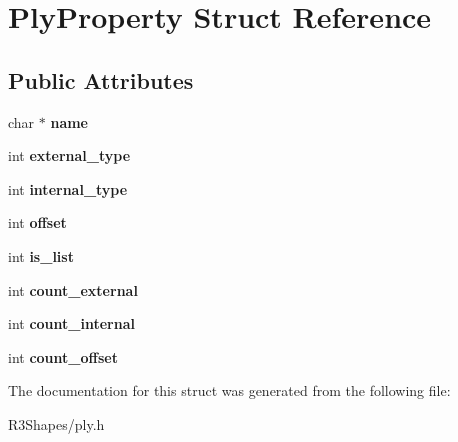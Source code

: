 \hypertarget{struct_ply_property}{}\section{Ply\+Property Struct Reference}
\label{struct_ply_property}
\subsection*{Public Attributes}
\begin{DoxyCompactItemize}
\item 
char $\ast$ {\bfseries name}\hypertarget{struct_ply_property_a286f11ca61eb9eaa3c52a44bbaeadfc9}{}\label{struct_ply_property_a286f11ca61eb9eaa3c52a44bbaeadfc9}

\item 
int {\bfseries external\+\_\+type}\hypertarget{struct_ply_property_a0ddc732a043a2dceef8cd0849f8fe61e}{}\label{struct_ply_property_a0ddc732a043a2dceef8cd0849f8fe61e}

\item 
int {\bfseries internal\+\_\+type}\hypertarget{struct_ply_property_a52decfabbe6c612b2c10213207b0a2d6}{}\label{struct_ply_property_a52decfabbe6c612b2c10213207b0a2d6}

\item 
int {\bfseries offset}\hypertarget{struct_ply_property_aeedc40380a29a69699ce401f4cb7aa3f}{}\label{struct_ply_property_aeedc40380a29a69699ce401f4cb7aa3f}

\item 
int {\bfseries is\+\_\+list}\hypertarget{struct_ply_property_abe1deb9f2985fc45921c51b9b762a9c9}{}\label{struct_ply_property_abe1deb9f2985fc45921c51b9b762a9c9}

\item 
int {\bfseries count\+\_\+external}\hypertarget{struct_ply_property_a237469e443b4a87444ce5e21512b2649}{}\label{struct_ply_property_a237469e443b4a87444ce5e21512b2649}

\item 
int {\bfseries count\+\_\+internal}\hypertarget{struct_ply_property_a3d8a82157e2863a19b63886a3488cc64}{}\label{struct_ply_property_a3d8a82157e2863a19b63886a3488cc64}

\item 
int {\bfseries count\+\_\+offset}\hypertarget{struct_ply_property_a1f788f0c065d945e271e8c4d985d2bf2}{}\label{struct_ply_property_a1f788f0c065d945e271e8c4d985d2bf2}

\end{DoxyCompactItemize}


The documentation for this struct was generated from the following file\+:\begin{DoxyCompactItemize}
\item 
R3\+Shapes/ply.\+h\end{DoxyCompactItemize}
